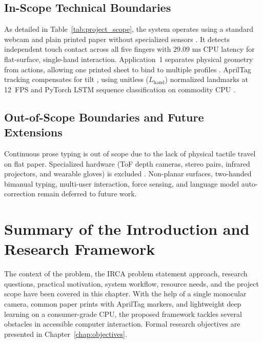 \subsection{In-Scope Technical Boundaries}
\label{subsec:in_scope_boundaries}
As detailed in Table~\ref{tab:project_scope}, the system operates using a standard webcam and plain printed paper without specialized sensors \cite{Posner2012Single, Sreenath2021Monocular}. It detects independent touch contact across all five fingers with $29.09\text{ ms}$ CPU latency for flat-surface, single-hand interaction. Application~1 separates physical geometry from actions, allowing one printed sheet to bind to multiple profiles \cite{Doan2022Efficient}. AprilTag tracking compensates for tilt \cite{Wang2016AprilTag2, Kalaitzakis2021Fiducial}, using unitless ($L_{\text{hand}}$) normalized landmarks at 12~FPS and PyTorch LSTM sequence classification on commodity CPU \cite{Zhang2020MediaPipe, GilMartin2023Hand}.

\subsection{Out-of-Scope Boundaries and Future Extensions}
\label{subsec:out_scope_boundaries}
Continuous prose typing is out of scope due to the lack of physical tactile travel on flat paper. Specialized hardware (ToF depth cameras, stereo pairs, infrared projectors, and wearable gloves) is excluded \cite{Lee2019Virtual, Kudale2016RealTime}. Non-planar surfaces, two-handed bimanual typing, multi-user interaction, force sensing, and language model auto-correction remain deferred to future work.

\section{Summary of the Introduction and Research Framework}
\label{sec:chapter_summary}
The context of the problem, the IRCA problem statement approach, research questions, practical motivation, system workflow, resource needs, and the project scope have been covered in this chapter. With the help of a single monocular camera, common paper prints with AprilTag markers, and lightweight deep learning on a consumer-grade CPU, the proposed framework tackles several obstacles in accessible computer interaction. Formal research objectives are presented in Chapter~\ref{chap:objectives}.
